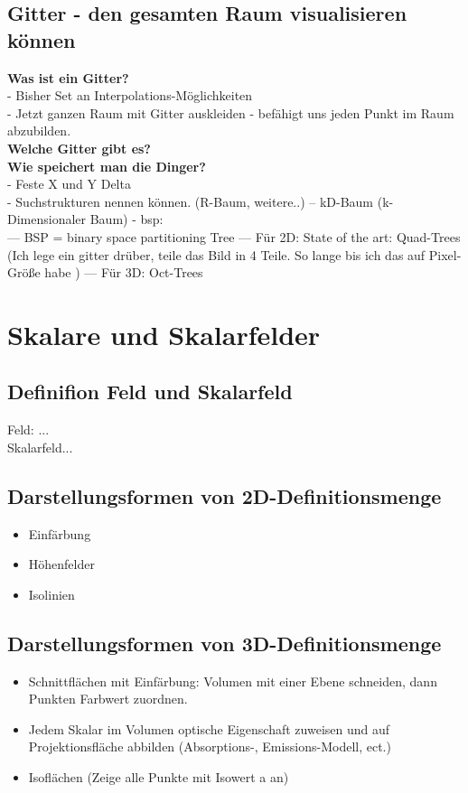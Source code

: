 \documentclass{article}
\begin{document}
\subsection{Gitter - den gesamten Raum visualisieren können}
\noindent \textbf{Was ist ein Gitter?}\\
- Bisher Set an Interpolations-Möglichkeiten\\
- Jetzt ganzen Raum mit Gitter auskleiden - befähigt uns jeden Punkt im Raum abzubilden.\\

\noindent \textbf{Welche Gitter gibt es?}\\

\noindent \textbf{Wie speichert man die Dinger?}\\
- Feste X und Y Delta\\
- Suchstrukturen nennen können. (R-Baum, weitere..)
-- kD-Baum (k-Dimensionaler Baum) - bsp:\\
--- BSP = binary space partitioning Tree
--- Für 2D:  State of the art: Quad-Trees (Ich lege ein gitter drüber, teile das Bild in 4 Teile. So lange bis ich das auf Pixel-Größe habe )
--- Für 3D: Oct-Trees
\pagebreak

\section{Skalare und Skalarfelder}

\subsection{Definifion Feld und Skalarfeld}
Feld: ...\\
Skalarfeld...

\subsection{Darstellungsformen von 2D-Definitionsmenge}
\begin{itemize}[noitemsep]
	\item Einfärbung
	\item Höhenfelder
	\item Isolinien
\end{itemize}

\subsection{Darstellungsformen von 3D-Definitionsmenge}
\begin{itemize}[noitemsep]
	\item Schnittflächen mit Einfärbung: Volumen mit einer Ebene schneiden, dann Punkten Farbwert zuordnen.
	\item Jedem Skalar im Volumen optische Eigenschaft zuweisen und auf Projektionsfläche abbilden (Absorptions-, Emissions-Modell, ect.)
	\item Isoflächen (Zeige alle Punkte mit Isowert a an)
\end{itemize}
\end{document}

